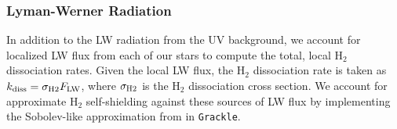 \documentclass[twocolumn]{aastex61}
\begin{document}
\subsubsection{Lyman-Werner Radiation}
\label{sec:LW}
In addition to the LW radiation from the UV background, we account for localized LW flux from each of our stars to compute the total, local H$_2$ dissociation rates. Given the local LW flux, the H$_2$ dissociation rate is taken as $k_{\rm diss} = \sigma_{\rm H2} F_{\rm LW}$, where $\sigma_{\rm H2}$ is the H$_2$ dissociation cross section. We account for approximate H$_2$ self-shielding against these sources of LW flux by implementing the Sobolev-like approximation from \citet{Wolcott-Green2011} in \texttt{Grackle}. 

%
%

\end{document}
